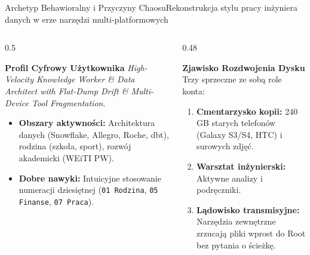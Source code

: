 \documentclass[aspectratio=169, 10pt]{beamer}
\begin{document}
\begin{frame}{Archetyp Behawioralny i Przyczyny Chaosu}{Rekonstrukcja stylu pracy inżyniera danych w erze narzędzi multi-platformowych}
  \begin{columns}[T]
    \begin{column}{0.5\textwidth}
      \begin{block}{\textbf{Profil Cyfrowy Użytkownika}}
        \textit{High-Velocity Knowledge Worker \& Data Architect with Flat-Dump Drift \& Multi-Device Tool Fragmentation}.
        \begin{itemize}
          \item \textbf{Obszary aktywności:} Architektura danych (Snowflake, Allegro, Roche, dbt), rodzina (szkoła, sport), rozwój akademicki (WEiTI PW).
          \item \textbf{Dobre nawyki:} Intuicyjne stosowanie numeracji dziesiętnej (\texttt{01 Rodzina}, \texttt{05 Finanse}, \texttt{07 Praca}).
        \end{itemize}
      \end{block}
    \end{column}

    \begin{column}{0.48\textwidth}
      \begin{alertblock}{\textbf{Zjawisko Rozdwojenia Dysku}}
        Trzy sprzeczne ze sobą role konta:
        \begin{enumerate}
          \item \textbf{Cmentarzysko kopii:} 240 GB starych telefonów (Galaxy S3/S4, HTC) i surowych zdjęć.
          \item \textbf{Warsztat inżynierski:} Aktywne analizy i podręczniki.
          \item \textbf{Lądowisko transmisyjne:} Narzędzia zewnętrzne zrzucają pliki wprost do Root bez pytania o ścieżkę.
        \end{enumerate}
      \end{alertblock}
    \end{column}
  \end{columns}
\end{frame}
\end{document}
